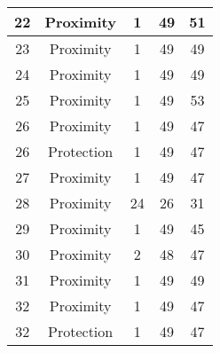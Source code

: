 \documentclass[results.tex]{subfiles}
\begin{document}
\begin{center}
\begin{tabular}{| c || c | c | c | c |}
            \hline
            22                      & Proximity                    & 1                      & 49                      & 51                   \\
            \hline
            23                      & Proximity                    & 1                      & 49                      & 49                   \\
            \hline
            24                      & Proximity                    & 1                      & 49                      & 49                   \\
            \hline
            25                      & Proximity                    & 1                      & 49                      & 53                   \\
            \hline
            26                      & Proximity                    & 1                      & 49                      & 47                   \\
            \hline
            26                      & Protection                   & 1                      & 49                      & 47                   \\
            \hline
            27                      & Proximity                    & 1                      & 49                      & 47                   \\
            \hline
            28                      & Proximity                    & 24                     & 26                      & 31                   \\
            \hline
            29                      & Proximity                    & 1                      & 49                      & 45                   \\
            \hline
            30                      & Proximity                    & 2                      & 48                      & 47                   \\
            \hline
            31                      & Proximity                    & 1                      & 49                      & 49                   \\
            \hline
            32                      & Proximity                    & 1                      & 49                      & 47                   \\
            \hline
            32                      & Protection                   & 1                      & 49                      & 47                   \\

\end{tabular}
\end{center}
\end{document}
